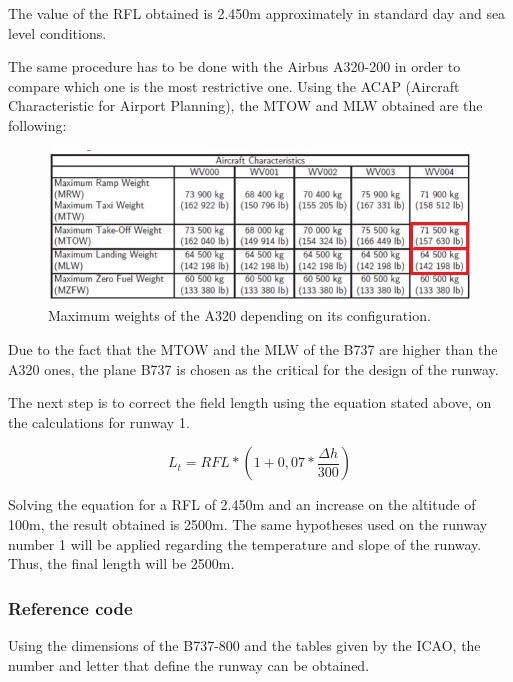 		The value of the RFL obtained is 2.450m approximately in standard day and sea level conditions. 
		
		The same procedure has to be done with the Airbus A320-200 in order to compare which one is the most restrictive one. Using the ACAP (Aircraft Characteristic for Airport Planning), the MTOW and MLW obtained are the following:
		
		\begin{figure}[H]
			\centering
			\includegraphics[clip, trim=0cm 0cm 0cm 0cm, width=1\textwidth]{./images/A320/A320MTOW}
			\caption{Maximum weights of the A320 depending on its configuration.} %
			\label{} %
		\end{figure}
	
		Due to the fact that the MTOW and the MLW of the B737 are higher than the A320 ones, the plane B737 is chosen as the critical for the design of the runway. 		
		
		The next step is to correct the field length using the equation stated above, on the calculations for runway 1. 
	
		\[L_t=RFL*(1+0,07*\frac{\Delta h}{300})\]
		
		Solving the equation for a RFL of 2.450m and an increase on the altitude of 100m, the result obtained is 2500m.
		The same hypotheses used on the runway number 1 will be applied regarding the temperature and slope of the runway.  Thus, the final length will be 2500m.
		
		\subsubsection{Reference code}
		Using the dimensions of the B737-800 and the tables given by the ICAO, the number and letter that define the runway can be obtained. 
		
